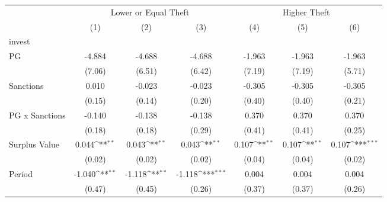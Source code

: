 {
\def\sym#1{\ifmmode^{#1}\else\(^{#1}\)\fi}
\begin{tabular}{l*{6}{c}}
\toprule
                    &\multicolumn{3}{c}{Lower or Equal Theft}                         &\multicolumn{3}{c}{Higher Theft}                                 \\\cmidrule(lr){2-4}\cmidrule(lr){5-7}
                    &\multicolumn{1}{c}{(1)}         &\multicolumn{1}{c}{(2)}         &\multicolumn{1}{c}{(3)}         &\multicolumn{1}{c}{(4)}         &\multicolumn{1}{c}{(5)}         &\multicolumn{1}{c}{(6)}         \\
\midrule
invest              &                     &                     &                     &                     &                     &                     \\
PG                  &      -4.884         &      -4.688         &      -4.688         &      -1.963         &      -1.963         &      -1.963         \\
                    &      (7.06)         &      (6.51)         &      (6.42)         &      (7.19)         &      (7.19)         &      (5.71)         \\
Sanctions           &       0.010         &      -0.023         &      -0.023         &      -0.305         &      -0.305         &      -0.305         \\
                    &      (0.15)         &      (0.14)         &      (0.20)         &      (0.40)         &      (0.40)         &      (0.21)         \\
PG x Sanctions      &      -0.140         &      -0.138         &      -0.138         &       0.370         &       0.370         &       0.370         \\
                    &      (0.18)         &      (0.18)         &      (0.29)         &      (0.41)         &      (0.41)         &      (0.25)         \\
Surplus Value       &       0.044\sym{**} &       0.043\sym{**} &       0.043\sym{**} &       0.107\sym{**} &       0.107\sym{**} &       0.107\sym{***}\\
                    &      (0.02)         &      (0.02)         &      (0.02)         &      (0.04)         &      (0.04)         &      (0.02)         \\
Period              &      -1.040\sym{**} &      -1.118\sym{**} &      -1.118\sym{***}&       0.004         &       0.004         &       0.004         \\
                    &      (0.47)         &      (0.45)         &      (0.26)         &      (0.37)         &      (0.37)         &      (0.26)         \\

\end{tabular}}
